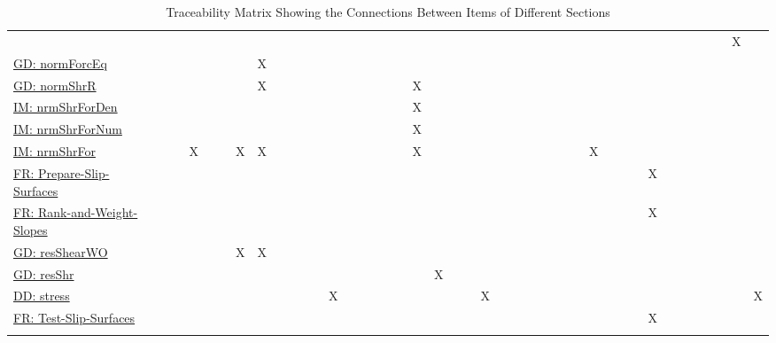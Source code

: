 \documentclass[12pt]{article}
\begin{document}
\begin{longtable}{l l l l l l l l l l l l l l l l l l l l l l l l l l l l l l l l l l l l l l l l l l l}
\\
 &  &  &  &  &  &  &  &  &  &  &  &  &  &  &  &  &  &  &  &  &  &  &  &  &  &  &  &  &  &  &  &  &  &  &  &  &  &  &  &  & X & 
\\
\hyperref[GD:normForcEq]{GD: normForcEq} &  &  &  &  &  &  &  & X &  &  &  &  &  &  &  &  &  &  &  &  &  &  &  &  &  &  &  &  &  &  &  &  &  &  &  &  &  &  &  &  &  & 
\\
\hyperref[GD:normShrR]{GD: normShrR} &  &  &  &  &  &  &  & X &  &  &  &  &  &  &  &  &  &  & X &  &  &  &  &  &  &  &  &  &  &  &  &  &  &  &  &  &  &  &  &  &  & 
\\
\hyperref[IM:nrmShrForDen]{IM: nrmShrForDen} &  &  &  &  &  &  &  &  &  &  &  &  &  &  &  &  &  &  & X &  &  &  &  &  &  &  &  &  &  &  &  &  &  &  &  &  &  &  &  &  &  & 
\\
\hyperref[IM:nrmShrForNum]{IM: nrmShrForNum} &  &  &  &  &  &  &  &  &  &  &  &  &  &  &  &  &  &  & X &  &  &  &  &  &  &  &  &  &  &  &  &  &  &  &  &  &  &  &  &  &  & 
\\
\hyperref[IM:nrmShrFor]{IM: nrmShrFor} &  &  &  & X &  &  & X & X &  &  &  &  &  &  &  &  &  &  & X &  &  &  &  &  &  &  &  &  &  &  & X &  &  &  &  &  &  &  &  &  &  & 
\\
\hyperref[prepareSlipS]{FR: Prepare-Slip-Surfaces} &  &  &  &  &  &  &  &  &  &  &  &  &  &  &  &  &  &  &  &  &  &  &  &  &  &  &  &  &  &  &  &  &  &  & X &  &  &  &  &  &  & 
\\
\hyperref[rankSlope]{FR: Rank-and-Weight-Slopes} &  &  &  &  &  &  &  &  &  &  &  &  &  &  &  &  &  &  &  &  &  &  &  &  &  &  &  &  &  &  &  &  &  &  & X &  &  &  &  &  &  & 
\\
\hyperref[GD:resShearWO]{GD: resShearWO} &  &  &  &  &  &  & X & X &  &  &  &  &  &  &  &  &  &  &  &  &  &  &  &  &  &  &  &  &  &  &  &  &  &  &  &  &  &  &  &  &  & 
\\
\hyperref[GD:resShr]{GD: resShr} &  &  &  &  &  &  &  &  &  &  &  &  &  &  &  &  &  &  &  & X &  &  &  &  &  &  &  &  &  &  &  &  &  &  &  &  &  &  &  &  &  & 
\\
\hyperref[DD:stress]{DD: stress} &  &  &  &  &  &  &  &  &  &  &  &  & X &  &  &  &  &  &  &  &  &  & X &  &  &  &  &  &  &  &  &  &  &  &  &  &  &  &  &  &  & X
\\
\hyperref[testSlipSrf]{FR: Test-Slip-Surfaces} &  &  &  &  &  &  &  &  &  &  &  &  &  &  &  &  &  &  &  &  &  &  &  &  &  &  &  &  &  &  &  &  &  &  & X &  &  &  &  &  &  & 
\\
\bottomrule
\caption{Traceability Matrix Showing the Connections Between Items of Different Sections}
\label{Table:Tracey}
\end{longtable}
\end{document}
